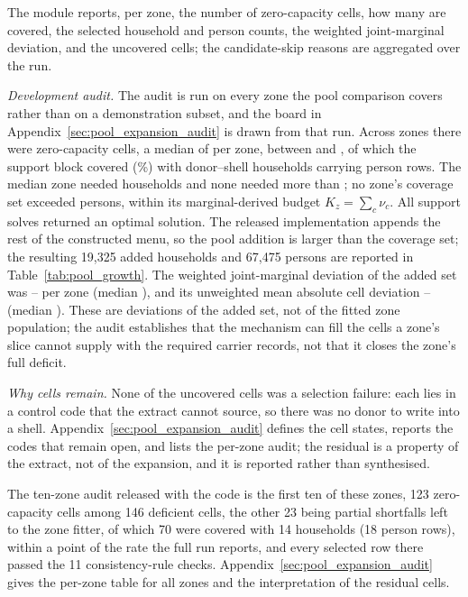 The module reports, per zone, the number of zero-capacity cells, how many are
covered, the selected household and person counts, the weighted joint-marginal
deviation, and the uncovered cells; the candidate-skip reasons are aggregated
over the run.

\emph{Development audit.} The audit is run on every zone the pool comparison
covers rather than on a demonstration subset, and the board in
Appendix~\ref{sec:pool_expansion_audit} is drawn from that run. Across \ExpZones{} zones there
were \ExpZeroCells{} zero-capacity cells, a median of \ExpZeroMedian{} per zone,
between \ExpZeroMin{} and \ExpZeroMax{}, of which the support block covered
\ExpCoveredCells{} (\ExpCoverPct\%) with \ExpAddedHouseholds{} donor--shell
households carrying \ExpAddedPersons{} person rows. The median zone needed
\ExpMedianHouseholds{} households and none needed more than \ExpMaxHouseholds; no
zone's coverage set exceeded \ExpMaxPersons{} persons, within its marginal-derived
budget $K_z=\sum_c\nu_c$. All \ExpOptimalSolves{} support solves returned an
optimal solution. The released implementation appends the rest of the constructed
menu, so the pool addition is larger than the coverage set; the resulting
19{,}325 added households and 67{,}475 persons are reported in
Table~\ref{tab:pool_growth}. The weighted joint-marginal deviation of the added set was
\ExpDevSumMin--\ExpDevSumMax{} per zone (median \ExpDevSumMedian), and its
unweighted mean absolute cell deviation \ExpDevMeanMin--\ExpDevMeanMax{}
(median \ExpDevMeanMedian). These are deviations of the added set, not of the
fitted zone population; the audit establishes that the mechanism can fill the
cells a zone's slice cannot supply with the required carrier records, not that it
closes the zone's full deficit.

\emph{Why cells remain.} None of the \ExpUncoveredCells{} uncovered cells was a
selection failure: each lies in a control code that the extract cannot source, so
there was no donor to write into a shell. Appendix~\ref{sec:pool_expansion_audit}
defines the cell states, reports the codes that remain open, and lists the per-zone
audit; the residual is a property of the extract, not of the expansion, and it is
reported rather than synthesised.

The ten-zone audit released with the code is the first ten of these zones, 123
zero-capacity cells among 146 deficient cells, the other 23 being partial
shortfalls left to the zone fitter, of which 70 were covered with 14 households
(18 person rows), within a point of the rate the full run reports, and every
selected row there passed the 11 consistency-rule checks.
Appendix~\ref{sec:pool_expansion_audit} gives the per-zone table for all
\ExpZones{} zones and the interpretation of the residual cells.

